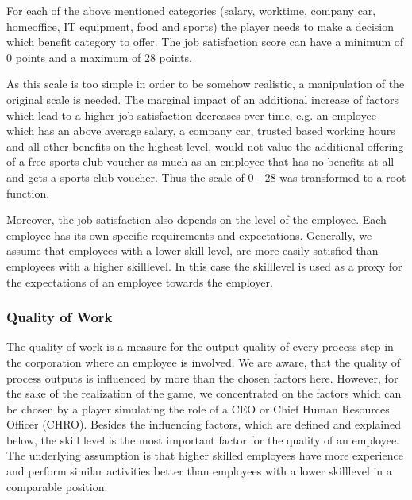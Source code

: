 For each of the above mentioned categories (salary, worktime, company car, homeoffice, IT equipment, food and sports) the player needs to make a decision which benefit category to offer. The job satisfaction score can have a minimum of 0 points and a maximum of 28 points.

As this scale is too simple in order to be somehow realistic, a manipulation of the original scale is needed. The marginal impact of an additional increase of factors which lead to a higher job satisfaction decreases over time, e.g. an employee which has an above average salary, a company car, trusted based working hours and all other benefits on the highest level, would not value the additional offering of a free sports club voucher as much as an employee that has no benefits at all and gets a sports club voucher. Thus the scale of 0 - 28 was transformed to a root function.

Moreover, the job satisfaction also depends on the level of the employee. Each employee has its own specific requirements and expectations. Generally, we assume that employees with a lower skill level, are more easily satisfied than employees with a higher skilllevel. In this case the skilllevel  is used as a proxy for the expectations of an employee towards the employer. 


\subsubsection{Quality of Work}
The quality of work is a measure for the output quality of every process step in the corporation where an employee is involved. We are aware, that the quality of process outputs is influenced by more than the chosen factors here. However, for the sake of the realization of the game, we concentrated on the factors which can be chosen by a player simulating the role of a CEO or Chief Human Resources Officer (CHRO). Besides the influencing factors, which are defined and explained below, the skill level is the most important factor for the quality of an employee. The underlying assumption is that higher skilled employees have more experience and perform similar activities better than employees with a lower skilllevel in a comparable position.

